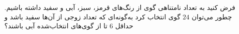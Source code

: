 \EXERCISE
فرض کنید به تعداد نامتناهی گوی از رنگ‌های قرمز، سبز، آبی و سفید داشته باشیم. چطور می‌توان
$24$
گوی انتخاب کرد به‌گونه‌ای که تعداد زوجی از آن‌ها سفید باشد و حداقل
$6$
تا از گوی‌های انتخاب‌شده آبی باشند؟